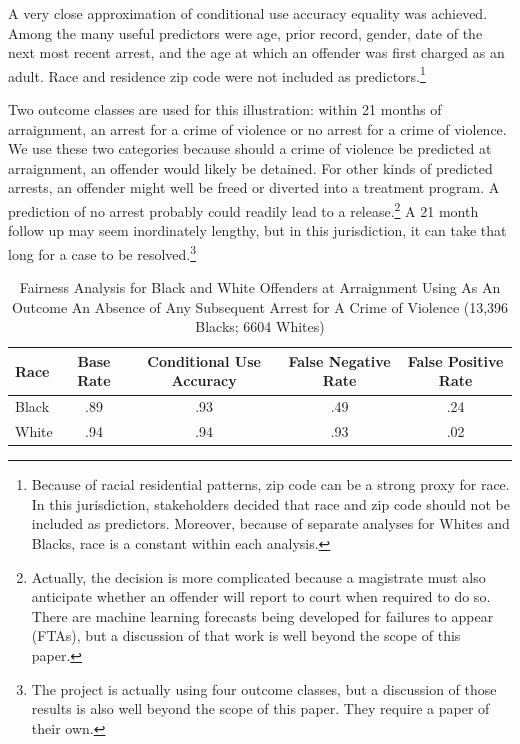 \documentclass[12pt]{article}
\begin{document}
 A very close approximation of conditional use accuracy equality was achieved. Among the many useful predictors were age, prior record, gender, date of the next most recent arrest, and the age at which an offender was first charged as an adult. Race and residence zip code were not included as predictors.\footnote
{
Because of racial residential patterns, zip code can be a strong proxy for race. In this jurisdiction, stakeholders decided that race and zip code should not be included as predictors. Moreover, because of separate analyses for Whites and Blacks, race is a constant within each analysis. 
}

Two outcome classes are used for this illustration: within 21 months of arraignment, an arrest for a crime of violence or no arrest for a crime of violence. We use these two categories because should a crime of violence be predicted at arraignment, an offender would likely be detained. For other kinds of predicted arrests, an offender might well be freed or diverted into a treatment program. A prediction of no arrest probably could readily lead to a release.\footnote
{
Actually, the decision is more complicated because a magistrate must also anticipate whether an offender will report to court when required to do so. There are machine learning forecasts being developed for failures to appear (FTAs), but a discussion of that work is well beyond the scope of this paper.
}
A 21 month follow up may seem inordinately lengthy, but in this jurisdiction, it can take that long for a case to be resolved.\footnote
{
The project is actually using four outcome classes, but a discussion of those results is also well beyond the scope of this paper. They require a paper of their own.
} 

\begin{table}
\caption{Fairness Analysis for Black and White Offenders at Arraignment Using As An Outcome An Absence of Any Subsequent Arrest for A Crime of Violence (13,396 Blacks; 6604 Whites)}
\scriptsize
\begin{center}
\begin{tabular}{|l|c|c|c|c|}
\hline \hline
Race & Base Rate &  Conditional Use Accuracy  & False Negative Rate & False Positive Rate \\
\hline 
{Black} & {.89} & {.93} & {.49} & {.24} \\
{White} & {.94} & {.94} & {.93} & {.02} \\
\hline \hline
\end{tabular}
\end{center}
\label{tab:fair}
\end{table}
\end{document}
